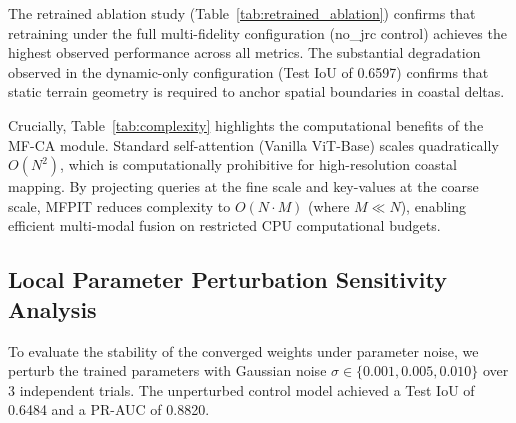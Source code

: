 \documentclass[preprint,12pt]{elsarticle}
\begin{document}
\begin{table}[htbp]
\caption{Computational Complexity and Parameter Benchmarking}
\label{tab:complexity}
\centering
\small
{}
\end{table}

The retrained ablation study (Table~\ref{tab:retrained_ablation}) confirms that retraining under the full multi-fidelity configuration (no\_jrc control) achieves the highest observed performance across all metrics. The substantial degradation observed in the dynamic-only configuration (Test IoU of 0.6597) confirms that static terrain geometry is required to anchor spatial boundaries in coastal deltas. 

Crucially, Table~\ref{tab:complexity} highlights the computational benefits of the MF-CA module. Standard self-attention (Vanilla ViT-Base) scales quadratically $O(N^2)$, which is computationally prohibitive for high-resolution coastal mapping. By projecting queries at the fine scale and key-values at the coarse scale, MFPIT reduces complexity to $O(N \cdot M)$ (where $M \ll N$), enabling efficient multi-modal fusion on restricted CPU computational budgets.

\subsection{Local Parameter Perturbation Sensitivity Analysis}
To evaluate the stability of the converged weights under parameter noise, we perturb the trained parameters with Gaussian noise $\sigma \in \{0.001, 0.005, 0.010\}$ over 3 independent trials. The unperturbed control model achieved a Test IoU of 0.6484 and a PR-AUC of 0.8820.
\end{document}
